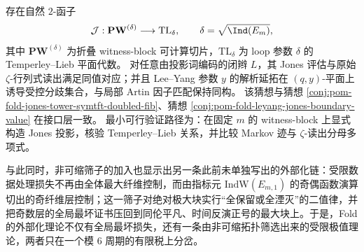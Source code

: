 \begin{conjecture}\label{conj:conclusion-fold-jones-spectral-topological-equivalence}
存在自然 \(2\)-函子
\[
\mathcal J:\mathbf{PW}^{(\delta)}\longrightarrow \mathrm{TL}_{\delta},
\qquad
\delta=\sqrt{\Ind(E_m)},
\]
其中 \(\mathbf{PW}^{(\delta)}\) 为折叠 witness-block 可计算切片，\(\mathrm{TL}_{\delta}\) 为 loop 参数 \(\delta\) 的 Temperley--Lieb 平面代数。
对任意由投影词编码的闭辫 \(L\)，其 Jones 评估与原始 \(\zeta\)-行列式读出满足同值对应；并且 Lee--Yang 参数 \(y\) 的解析延拓在 \((q,y)\)-平面上诱导受控分歧集合，与局部 Artin 因子匹配保持同构。
该猜想与猜想 \ref{conj:pom-fold-jones-tower-symtft-doubled-fib}、猜想 \ref{conj:pom-fold-leyang-jones-boundary-value} 在接口层一致。
最小可行验证路径为：在固定 \(m\) 的 witness-block 上显式构造 Jones 投影，核验 Temperley--Lieb 关系，并比较 Markov 迹与 \(\zeta\)-读出分母多项式。
\end{conjecture}

\noindent
与此同时，非可缩筛子的加入也显示出另一条此前未单独写出的外部化链：受限数据处理损失不再由全体最大纤维控制，而由指标元 \(\mathrm{IndW}(E_{m,1})\) 的奇偶函数演算切出的奇纤维层控制；这一筛子对绝对极大块实行“全保留或全湮灭”的二值律，并把奇数层的全局最坏证书压回到同伦平凡、时间反演正号的最大块上。于是，Fold 的外部化理论不仅有全局最坏损失，还有一条由非可缩拓扑筛选出来的受限极值理论，两者只在一个模 \(6\) 周期的有限税上分岔。

\endinput
